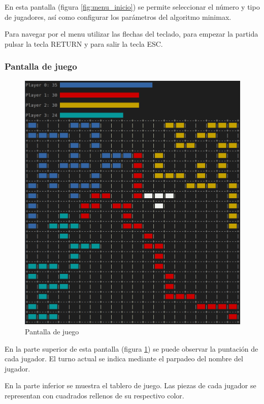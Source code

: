 En esta pantalla (figura \ref{fig:menu_inicio}) se permite seleccionar el número
y tipo de jugadores, así como configurar los parámetros del algoritmo minimax.

Para navegar por el menu utilizar las flechas del teclado, para empezar la
partida pulsar la tecla RETURN y para salir la tecla ESC.

\subsubsection{Pantalla de juego}
\begin{figure}[ht]
	\centering
	\includegraphics[width=\textwidth, height=0.6\textheight, keepaspectratio]{img/tui-game}
	\caption{Pantalla de juego}
	\label{fig:pantalla_juego}
\end{figure}

En la parte superior de esta pantalla (figura \ref{fig:pantalla_juego}) se puede
observar la puntación de cada jugador. El turno actual se indica mediante el
parpadeo del nombre del jugador.

En la parte inferior se muestra el tablero de juego. Las piezas de cada jugador
se representan con cuadrados rellenos de su respectivo color.

